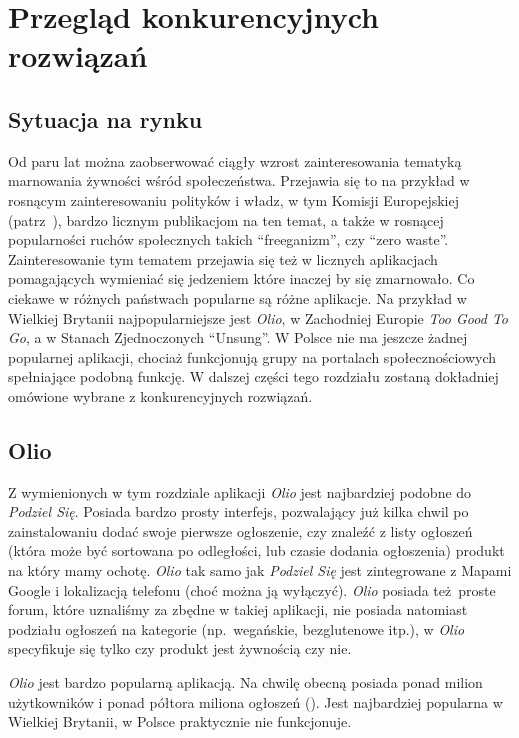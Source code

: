 \documentclass[licencjacka]{pracamgr}
\begin{document}
\chapter{Przegląd konkurencyjnych rozwiązań}\label{r:konkurencja}

\section{Sytuacja na rynku}
Od paru lat można zaobserwować ciągły wzrost zainteresowania tematyką marnowania żywności wśród społeczeństwa. Przejawia się to na przykład w rosnącym zainteresowaniu polityków i władz, w tym Komisji Europejskiej (patrz~\cite{ec}), bardzo licznym publikacjom na ten temat, a także w rosnącej popularności ruchów społecznych takich ``freeganizm'', czy ``zero waste''. Zainteresowanie tym tematem przejawia się też w licznych aplikacjach pomagających wymieniać się jedzeniem które inaczej by się zmarnowało. Co ciekawe w różnych państwach popularne są różne aplikacje. Na przykład w Wielkiej Brytanii najpopularniejsze jest \textit{Olio}, w Zachodniej Europie \textit{Too Good To Go}, a w Stanach Zjednoczonych ``Unsung''. W Polsce nie ma jeszcze żadnej popularnej aplikacji, chociaż funkcjonują grupy na portalach społecznościowych spełniające podobną funkcję. W dalszej części tego rozdziału zostaną dokładniej omówione wybrane z konkurencyjnych rozwiązań.

\section{Olio}
Z wymienionych w tym rozdziale aplikacji \textit{Olio} jest najbardziej podobne do \textit{Podziel Się}. Posiada bardzo prosty interfejs, pozwalający już kilka chwil po zainstalowaniu dodać swoje pierwsze ogłoszenie, czy znaleźć z listy ogłoszeń (która może być sortowana po odległości, lub czasie dodania ogłoszenia) produkt na który mamy ochotę. \textit{Olio} tak samo jak \textit{Podziel Się} jest zintegrowane z Mapami Google i lokalizacją telefonu (choć można ją wyłączyć). \textit{Olio} posiada też proste forum, które uznaliśmy za zbędne w takiej aplikacji, nie posiada natomiast podziału ogłoszeń na kategorie (np.\ wegańskie, bezglutenowe itp.), w \textit{Olio} specyfikuje się tylko czy produkt jest żywnością czy nie.

\textit{Olio} jest bardzo popularną aplikacją. Na chwilę obecną posiada ponad milion użytkowników i ponad półtora miliona ogłoszeń (\cite{olio}). Jest najbardziej popularna w Wielkiej Brytanii, w Polsce praktycznie nie funkcjonuje.
\end{document}
